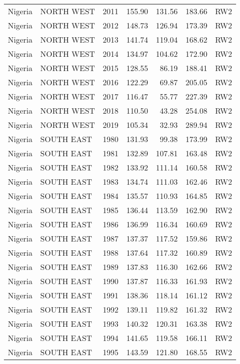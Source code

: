 \begin{longtable}{lllrrrl}
  Nigeria & NORTH WEST & 2011 & 155.90 & 131.56 & 183.66 & RW2 \\ 
  Nigeria & NORTH WEST & 2012 & 148.73 & 126.94 & 173.39 & RW2 \\ 
  Nigeria & NORTH WEST & 2013 & 141.74 & 119.04 & 168.62 & RW2 \\ 
  Nigeria & NORTH WEST & 2014 & 134.97 & 104.62 & 172.90 & RW2 \\ 
  Nigeria & NORTH WEST & 2015 & 128.55 & 86.19 & 188.41 & RW2 \\ 
  Nigeria & NORTH WEST & 2016 & 122.29 & 69.87 & 205.05 & RW2 \\ 
  Nigeria & NORTH WEST & 2017 & 116.47 & 55.77 & 227.39 & RW2 \\ 
  Nigeria & NORTH WEST & 2018 & 110.50 & 43.28 & 254.08 & RW2 \\ 
  Nigeria & NORTH WEST & 2019 & 105.34 & 32.93 & 289.94 & RW2 \\ 
  Nigeria & SOUTH EAST & 1980 & 131.93 & 99.38 & 173.99 & RW2 \\ 
  Nigeria & SOUTH EAST & 1981 & 132.89 & 107.81 & 163.48 & RW2 \\ 
  Nigeria & SOUTH EAST & 1982 & 133.92 & 111.14 & 160.58 & RW2 \\ 
  Nigeria & SOUTH EAST & 1983 & 134.74 & 111.03 & 162.46 & RW2 \\ 
  Nigeria & SOUTH EAST & 1984 & 135.57 & 110.93 & 164.85 & RW2 \\ 
  Nigeria & SOUTH EAST & 1985 & 136.44 & 113.59 & 162.90 & RW2 \\ 
  Nigeria & SOUTH EAST & 1986 & 136.99 & 116.34 & 160.69 & RW2 \\ 
  Nigeria & SOUTH EAST & 1987 & 137.37 & 117.52 & 159.86 & RW2 \\ 
  Nigeria & SOUTH EAST & 1988 & 137.64 & 117.32 & 160.89 & RW2 \\ 
  Nigeria & SOUTH EAST & 1989 & 137.83 & 116.30 & 162.66 & RW2 \\ 
  Nigeria & SOUTH EAST & 1990 & 137.87 & 116.33 & 161.93 & RW2 \\ 
  Nigeria & SOUTH EAST & 1991 & 138.36 & 118.14 & 161.12 & RW2 \\ 
  Nigeria & SOUTH EAST & 1992 & 139.11 & 119.82 & 161.32 & RW2 \\ 
  Nigeria & SOUTH EAST & 1993 & 140.32 & 120.31 & 163.38 & RW2 \\ 
  Nigeria & SOUTH EAST & 1994 & 141.65 & 119.58 & 166.11 & RW2 \\ 
  Nigeria & SOUTH EAST & 1995 & 143.59 & 121.80 & 168.55 & RW2 \\ 

\end{longtable}
